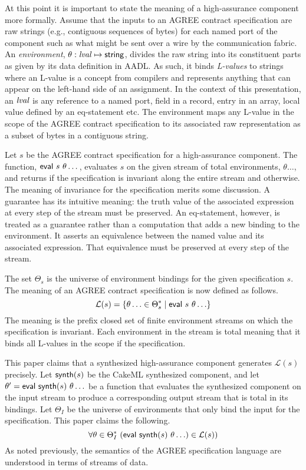 At this point it is important to state the meaning of a high-assurance component more formally. Assume that the inputs to an AGREE contract specification are raw strings (e.g., contiguous sequences of bytes) for each named port of the component such as what might be sent over a wire by the communication fabric. An \emph{environment}, $\theta: \mathit{lval} \mapsto \mathsf{string}$, divides the raw string into its constituent parts as given by its data definition in AADL. As such, it binds \emph{L-values} to strings where an L-value is a concept from compilers and represents anything that can appear on the left-hand side of an assignment. In the context of this presentation, an $\mathit{lval}$ is any reference to a named port, field in a record, entry in an array, local value defined by an eq-statement etc. The environment maps any L-value in the scope of the AGREE contract specification to its associated raw representation as a subset of bytes in a contiguous string.

Let $s$ be the AGREE contract specification for a high-assurance component. The function, $\konst{eval}\ s\ \theta\dots$, evaluates $s$ on the given stream of total environments, $\theta\dots$, and returns  if the specification is invariant along the entire stream and  otherwise. The meaning of invariance for the specification merits some discussion. A guarantee has its intuitive meaning: the truth value of the associated expression at every step of the stream must be preserved. An eq-statement, however, is treated as a guarantee rather than a computation that adds a new binding to the environment. It asserts an equivalence between the named value and its associated expression. That equivalence must be preserved at every step of the stream.

The set $\Theta_s$ is the universe of environment bindings for the given specification $s$. 
The meaning of an AGREE contract specification is now defined as follows.
%
\[
  \mathcal{L}(s) = \{\theta\ldots \in \Theta_s^* \mid \mathsf{eval}\ s\ \theta\ldots\}  
\]
%
The meaning is the prefix closed set of finite environment streams on which the specification is invariant. Each environment in the stream is total meaning that it binds all L-values in the scope if the specification.

This paper claims that a synthesized high-assurance component generates $\mathcal{L}(s)$ precisely. Let $\mathsf{synth}(s)$ be the CakeML synthesized component, and let $\theta^\prime = \konst{eval}\ \konst{synth}(s)\ \theta\ldots$ be a function that evaluates the synthesized component on the input stream to produce a corresponding output stream that is total in its bindings. Let $\Theta_I$ be the universe of environments that only bind the input for the specification. This paper claims the following.
%
\[
  \forall \theta \in \Theta_I^*\ (\konst{eval}\ \konst{synth}(s)\ \theta\ldots) \in \mathcal{L}(s)) 
\]
%
As noted previously, the semantics of the AGREE specification language are understood in terms of streams of data. 